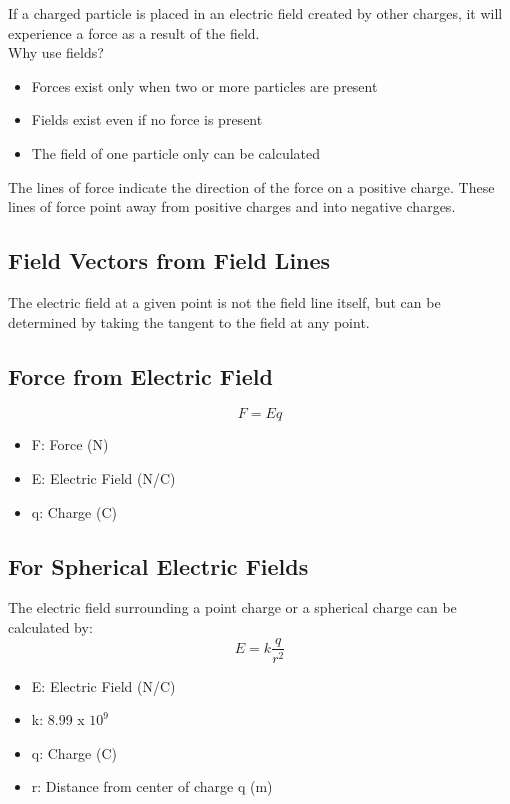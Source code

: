 If a charged particle is placed in an electric field created by other charges, it will experience a force as a result of the field.\\

Why use fields?
\begin{itemize}
	\item Forces exist only when two or more particles are present
	\item Fields exist even if no force is present
	\item The field of one particle only can be calculated
\end{itemize}

The lines of force indicate the direction of the force on a positive charge. These lines of force point away from positive charges and into negative charges.

\subsection{Field Vectors from Field Lines}
The electric field at a given point is not the field line itself, but can be determined by taking the tangent to the field at any point. 

\subsection{Force from Electric Field}
\[F=E q\]
\begin{itemize}
	\item F: Force (N)
	\item E: Electric Field (N/C)
	\item q: Charge (C)
\end{itemize}

\subsection{For Spherical Electric Fields}
The electric field surrounding a point charge or a spherical charge can be calculated by:
\[E=k\frac{q}{r^2}\]
\begin{itemize}
	\item E: Electric Field (N/C)
	\item k: 8.99 x $10^9$
	\item q: Charge (C)
	\item r: Distance from center of charge q (m)
\end{itemize}